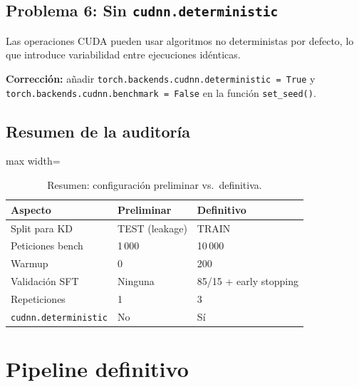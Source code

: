 \documentclass[11pt,a4paper]{article}
\begin{document}
\subsection{Problema 6: Sin \texttt{cudnn.deterministic}}

Las operaciones CUDA pueden usar algoritmos no deterministas por defecto,
lo que introduce variabilidad entre ejecuciones id\'enticas.

\textbf{Correcci\'on:} a\~nadir
\texttt{torch.backends.cudnn.deterministic = True} y
\texttt{torch.backends.cudnn.benchmark = False} en la funci\'on
\texttt{set\_seed()}.

\subsection{Resumen de la auditor\'ia}

\begin{table}[H]
\centering
\caption{Resumen: configuraci\'on preliminar vs.\ definitiva.}
\label{tab:audit-summary}
\begin{adjustbox}{max width=\textwidth}
\begin{tabular}{@{}p{4.5cm}ll@{}}
\toprule
\textbf{Aspecto} & \textbf{Preliminar} & \textbf{Definitivo} \\
\midrule
Split para KD          & \cellcolor{warnbg}TEST (leakage)
    & \cellcolor{okbg}TRAIN \\
Peticiones bench       & \cellcolor{warnbg}1\,000
    & \cellcolor{okbg}10\,000 \\
Warmup                 & \cellcolor{warnbg}0
    & \cellcolor{okbg}200 \\
Validaci\'on SFT       & \cellcolor{warnbg}Ninguna
    & \cellcolor{okbg}85/15 + early stopping \\
Repeticiones           & \cellcolor{warnbg}1
    & \cellcolor{okbg}3 \\
\texttt{cudnn.deterministic}
    & \cellcolor{warnbg}No & \cellcolor{okbg}S\'i \\
\bottomrule
\end{tabular}
\end{adjustbox}
\end{table}

\section{Pipeline definitivo}
\label{sec:definitive}
\end{document}
